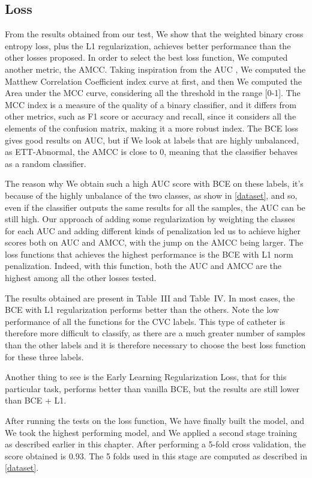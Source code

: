 \documentclass[journal, a4paper]{IEEEtran}
\begin{document}
\subsection{Loss}
From the results obtained from our test, We show that the weighted binary cross entropy loss, plus the L1 regularization, achieves better performance than the other losses proposed. In order to select the best loss function, We computed another metric, the AMCC. Taking inspiration from the AUC \cite{AUC}, We computed the Matthew Correlation Coefficient \cite{MCC} index curve at first, and then We computed the Area under the MCC curve, considering all the threshold in the range [0-1]. The MCC index is a measure of the quality of a binary classifier, and it differs from other metrics, such as F1 score or accuracy and recall, since it considers all the elements of the confusion matrix, making it a more robust index.
The BCE loss gives good results on AUC, but if We look at labels that are highly unbalanced, as ETT-Abnormal, the AMCC is close to 0, meaning that the classifier behaves as a random classifier.


The reason why We obtain such a high AUC score with BCE on these labels, it's because of the highly unbalance of the two classes, as show in \ref{dataset}, and so, even if the classifier outputs the same results for all the samples, the AUC can be still high. Our approach of adding some regularization by weighting the classes for each AUC and adding different kinds of penalization led us to achieve higher scores both on AUC and AMCC, with the jump on the AMCC being larger. The loss functions that achieves the highest performance is the BCE with L1 norm penalization. Indeed, with this function, both the AUC and AMCC are the highest among all the other losses tested.


The results obtained are present in Table~III and Table~IV. In most cases, the BCE with L1 regularization performs better than the others. Note the low performance of all the functions for the CVC labels. This type of catheter is therefore more difficult to classify, as there are a much greater number of samples than the other labels and it is therefore necessary to choose the best loss function for these three labels.
 
Another thing to see is the Early Learning Regularization Loss, that for this particular task, performs better than vanilla BCE, but the results are still lower than BCE + L1.

After running the tests on the loss function, We have finally built the model, and We took the highest performing model, and We applied a second stage training as described  earlier in this chapter.
After performing a 5-fold cross validation, the score obtained is 0.93.
The 5 folds used in this stage are computed as described in \ref{dataset}.
\end{document}

